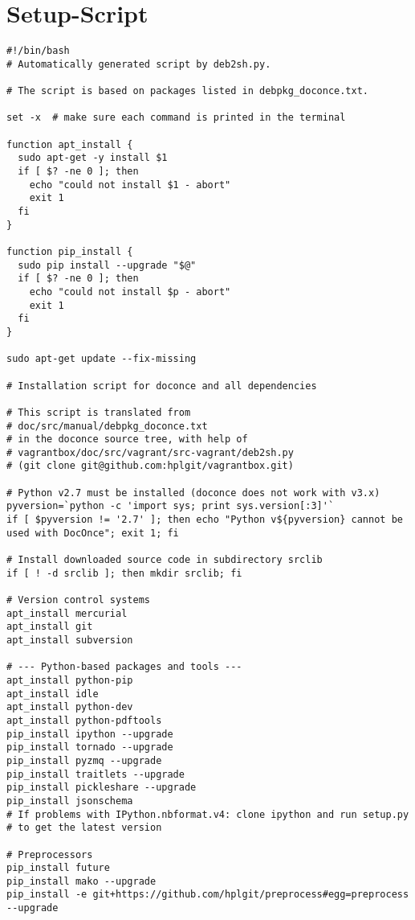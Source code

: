 \documentclass[%
oneside,                 %
final,                   %
chapterprefix=true,      %
open=right,              %
10pt]{book}
\begin{document}
\section{Setup-Script}
\begin{verbatim}
#!/bin/bash
# Automatically generated script by deb2sh.py.

# The script is based on packages listed in debpkg_doconce.txt.

set -x  # make sure each command is printed in the terminal

function apt_install {
  sudo apt-get -y install $1
  if [ $? -ne 0 ]; then
    echo "could not install $1 - abort"
    exit 1
  fi
}

function pip_install {
  sudo pip install --upgrade "$@"
  if [ $? -ne 0 ]; then
    echo "could not install $p - abort"
    exit 1
  fi
}

sudo apt-get update --fix-missing

# Installation script for doconce and all dependencies

# This script is translated from
# doc/src/manual/debpkg_doconce.txt
# in the doconce source tree, with help of
# vagrantbox/doc/src/vagrant/src-vagrant/deb2sh.py
# (git clone git@github.com:hplgit/vagrantbox.git)

# Python v2.7 must be installed (doconce does not work with v3.x)
pyversion=`python -c 'import sys; print sys.version[:3]'`
if [ $pyversion != '2.7' ]; then echo "Python v${pyversion} cannot be used with DocOnce"; exit 1; fi

# Install downloaded source code in subdirectory srclib
if [ ! -d srclib ]; then mkdir srclib; fi

# Version control systems
apt_install mercurial
apt_install git
apt_install subversion

# --- Python-based packages and tools ---
apt_install python-pip
apt_install idle
apt_install python-dev
apt_install python-pdftools
pip_install ipython --upgrade
pip_install tornado --upgrade
pip_install pyzmq --upgrade
pip_install traitlets --upgrade
pip_install pickleshare --upgrade
pip_install jsonschema
# If problems with IPython.nbformat.v4: clone ipython and run setup.py
# to get the latest version

# Preprocessors
pip_install future
pip_install mako --upgrade
pip_install -e git+https://github.com/hplgit/preprocess#egg=preprocess --upgrade


\end{verbatim}
\end{document}
